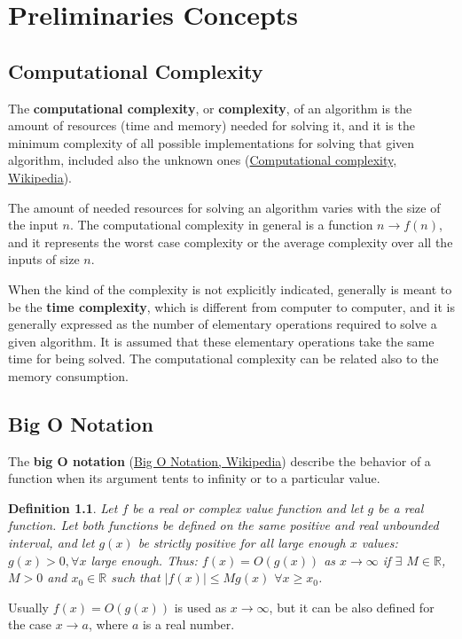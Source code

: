 \chapter{Preliminaries Concepts}
\label{preliminariesconcepts}
\newtheorem{definition}{Definition}
\newtheorem{example}{Example}

\section{Computational Complexity}
The \textbf{computational complexity}, or \textbf{complexity}, of an algorithm is the amount of resources (time and memory) needed for solving it, and it is the minimum complexity of all possible implementations for solving that given algorithm, included also the unknown ones \cite{wikipediacomplexity} (\href{https://en.wikipedia.org/wiki/Computational_complexity}{Computational complexity, Wikipedia}).

The amount of needed resources for solving an algorithm varies with the size of the input \(n\). The computational complexity in general is a function \(n \rightarrow f(n)\), and it represents the worst case complexity or the average complexity over all the inputs of size \(n\).

When the kind of the complexity is not explicitly indicated, generally is meant to be the \textbf{time complexity}, which is different from computer to computer, and it is generally expressed as the number of elementary operations required to solve a given algorithm. It is assumed that these elementary operations take the same time for being solved. The computational complexity can be related also to the memory consumption.

\section{Big O Notation}
The \textbf{big O notation} \cite{wikipediabigo} (\href{https://en.wikipedia.org/wiki/Big_O_notation}{Big O Notation, Wikipedia}) describe the behavior of a function when its argument tents to infinity or to a particular value.

\begin{definition}
Let \(f\) be a real or complex value function and let \(g\) be a real function. Let both functions be defined on the same positive and real unbounded interval, and let \(g(x)\) be strictly positive for all large enough \(x\) values: \(g(x) > 0, \forall x\) large enough. Thus: \(f(x)=O(g(x)) \) as \(x \rightarrow \infty \) if \(\exists\) \(M \in \mathbb{R} \), \(M>0\) and \(x_{0} \in \mathbb{R} \) such that \(|f(x)| \leq Mg(x)\) \(\forall x \geq x_{0}\). 
\end{definition}
Usually \(f(x)=O(g(x))\) is used as \(x \rightarrow \infty\), but it can be also defined for the case \(x \rightarrow a\), where \(a\) is a real number.

